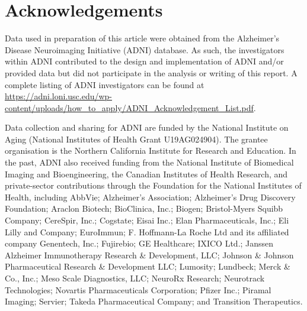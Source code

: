\documentclass[11pt]{article}
\theoremstyle{definition}
\begin{document}
\section*{Acknowledgements}

Data used in preparation of this article were obtained from the Alzheimer's Disease
Neuroimaging Initiative (ADNI) database. As such, the investigators within ADNI contributed
to the design and implementation of ADNI and/or provided data but did not participate in the
analysis or writing of this report. A complete listing of ADNI investigators can be found at
\url{https://adni.loni.usc.edu/wp-content/uploads/how_to_apply/ADNI_Acknowledgement_List.pdf}.

Data collection and sharing for ADNI are funded by the National Institute on Aging (National
Institutes of Health Grant U19AG024904). The grantee organisation is the Northern California
Institute for Research and Education. In the past, ADNI also received funding from the
National Institute of Biomedical Imaging and Bioengineering, the Canadian Institutes of
Health Research, and private-sector contributions through the Foundation for the National
Institutes of Health, including AbbVie; Alzheimer's Association; Alzheimer's Drug Discovery
Foundation; Araclon Biotech; BioClinica, Inc.; Biogen; Bristol-Myers Squibb Company;
CereSpir, Inc.; Cogstate; Eisai Inc.; Elan Pharmaceuticals, Inc.; Eli Lilly and Company;
EuroImmun; F. Hoffmann-La Roche Ltd and its affiliated company Genentech, Inc.; Fujirebio;
GE Healthcare; IXICO Ltd.; Janssen Alzheimer Immunotherapy Research \& Development, LLC;
Johnson \& Johnson Pharmaceutical Research \& Development LLC; Lumosity; Lundbeck; Merck
\& Co., Inc.; Meso Scale Diagnostics, LLC; NeuroRx Research; Neurotrack Technologies;
Novartis Pharmaceuticals Corporation; Pfizer Inc.; Piramal Imaging; Servier; Takeda
Pharmaceutical Company; and Transition Therapeutics.
\end{document}
